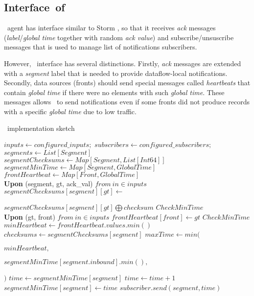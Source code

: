 \subsection{Interface\ of\ \tracker\ }
\tracker\ agent has interface similar to Storm \acker, so that it receives \textit{ack} messages (\textit{label}/\textit{global time} together with random \textit{ack value}) and subscribe/unsuscribe messages that is used to manage list of notifications subscribers. 

However, \tracker\  interface has several distinctions. Firstly, \textit{ack} messages are extended with a \textit{segment} label that is needed to provide dataflow-local notifications. Secondly, data sources (fronts) should send special messages called \textit{heartbeats} that contain \textit{global time} if there were no elements with such \textit{global time}. These messages allows \tracker\ to send notifications even if some fronts did not produce records with a specific \textit{global time} due to low traffic. 

\begin{algorithm}
\caption{\tracker\ implementation sketch}
\label{tracker_algo}
\begin{algorithmic}[1]
\State $inputs \leftarrow configured\_inputs;$ 
\State $subscribers \leftarrow configured\_subscribers;$
\State $segments \leftarrow List[Segment]$
\State $segmentChecksums \leftarrow Map[Segment, List[Int64]]$
\State $segmentMinTime \leftarrow Map[Segment, GlobalTime]$
\State $frontHeartbeat \leftarrow Map[Front, GlobalTime]$
\\
\State \textbf{Upon} (segment, gt, ack\_val) $from \ in\in inputs$
\Indent
    \State $segmentChecksums[segment][gt] \gets $
    \par\Indent\Indent$segmentChecksums[segment][gt] \bigoplus checksum$\EndIndent\EndIndent
    \State $CheckMinTime$
\EndIndent
\\
\State \textbf{Upon} (gt, front) $from \ in\in inputs$
\Indent
 \State $frontHeartbeat[front] \leftarrow gt$
 \State $CheckMinTime$
\EndIndent
\\
\State $minHeartbeat \leftarrow frontHeartbeat.values.min()$
\State $checksums \gets segmentChecksums[segment]$
\State $maxTime \gets min($
\par\Indent\Indent$minHeartbeat,$\EndIndent\EndIndent
\par\Indent\Indent$segmentMinTime[segment.inbound].min(),$\EndIndent\EndIndent
\par\Indent$)$\EndIndent
\State $time \gets segmentMinTime[segment]$
\State $time \gets time + 1$
\EndWhile
{}
\State $segmentMinTime[segment] \gets time$
\State $subscriber.send(segment, time)$
\EndFor
\EndIf
\EndFor
\EndProcedure
\end{algorithmic}
\end{algorithm}

